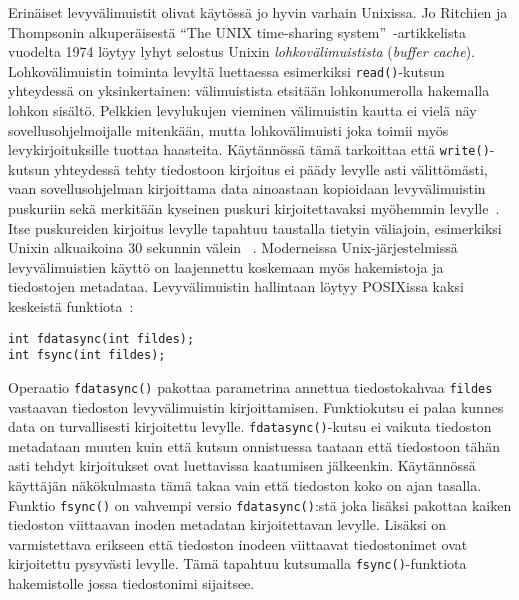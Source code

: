 Erinäiset levyvälimuistit olivat käytössä jo hyvin varhain Unixissa.
Jo Ritchien ja Thompsonin alkuperäisestä ``The UNIX time-sharing system''~\cite{UnixPaper}-artikkelista vuodelta 1974 löytyy lyhyt selostus Unixin \emph{lohkovälimuistista} (\emph{buffer cache}).
Lohkovälimuistin toiminta levyltä luettaessa esimerkiksi \texttt{read()}-kutsun yhteydessä on yksinkertainen:
välimuistista etsitään lohkonumerolla hakemalla lohkon sisältö.
Pelkkien levylukujen vieminen välimuistin kautta ei vielä näy sovellusohjelmoijalle mitenkään,
mutta lohkovälimuisti joka toimii myös levykirjoituksille tuottaa haasteita.
Käytännössä tämä tarkoittaa että \texttt{write()}-kutsun yhteydessä tehty tiedostoon kirjoitus ei päädy levylle asti välittömästi,
vaan sovellusohjelman kirjoittama data ainoastaan kopioidaan levyvälimuistin puskuriin sekä merkitään kyseinen puskuri kirjoitettavaksi myöhemmin levylle~\cite{UnixPaper}.
Itse puskureiden kirjoitus levylle tapahtuu taustalla tietyin väliajoin,
esimerkiksi Unixin alkuaikoina 30 sekunnin välein ~\cite{SpriteRosenblumThesis}.
Moderneissa Unix-järjestelmissä levyvälimuistien käyttö on laajennettu koskemaan myös hakemistoja ja tiedostojen metadataa.
%
%
Levyvälimuistin hallintaan löytyy POSIXissa kaksi keskeistä funktiota~\cite{PosixSpec}:
\begin{verbatim}
int fdatasync(int fildes);
int fsync(int fildes);
\end{verbatim}
%
Operaatio \texttt{fdatasync()} pakottaa parametrina annettua tiedostokahvaa \texttt{fildes} vastaavan tiedoston levyvälimuistin kirjoittamisen.
Funktiokutsu ei palaa kunnes data on turvallisesti kirjoitettu levylle.
\texttt{fdatasync()}-kutsu ei vaikuta tiedoston metadataan muuten kuin että kutsun onnistuessa taataan että tiedostoon tähän asti tehdyt kirjoitukset ovat luettavissa kaatumisen jälkeenkin.
Käytännössä käyttäjän näkökulmasta tämä takaa vain että tiedoston koko on ajan tasalla.
Funktio \texttt{fsync()} on vahvempi versio \texttt{fdatasync()}:stä joka lisäksi pakottaa kaiken tiedoston viittaavan inoden metadatan kirjoitettavan levylle.
Lisäksi on varmistettava erikseen että tiedoston inodeen viittaavat tiedostonimet ovat kirjoitettu pysyvästi levylle.
Tämä tapahtuu kutsumalla \texttt{fsync()}-funktiota hakemistolle jossa tiedostonimi sijaitsee.

